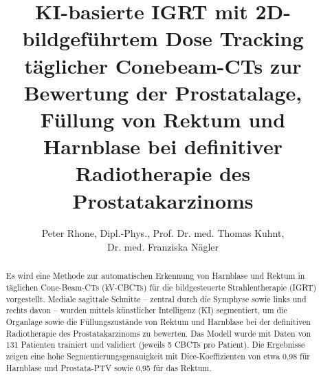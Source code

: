 \documentclass{article}
\begin{document}
\title{KI-basierte IGRT mit 2D-bildgeführtem Dose Tracking täglicher
Conebeam-CTs zur Bewertung der Prostatalage, Füllung von Rektum und Harnblase
bei definitiver Radiotherapie des Prostatakarzinoms}
\author{\begin{minipage}{0.8\textwidth}\centering \small Peter Rhone,
Dipl.-Phys., Prof. Dr. med. Thomas Kuhnt, \\ Dr. med. Franziska
Nägler\end{minipage}} \maketitle

\vspace{2cm}

\begin{abstract}
Es wird eine Methode zur automatischen Erkennung von Harnblase und Rektum in
täglichen Cone-Beam-CTs (kV-CBCTs) für die bildgesteuerte Strahlentherapie
(IGRT) vorgestellt. Mediale sagittale Schnitte – zentral durch die Symphyse
sowie links und rechts davon – wurden mittels künstlicher Intelligenz (KI)
segmentiert, um die Organlage sowie die Füllungszustände von Rektum und
Harnblase bei der definitiven Radiotherapie des Prostatakarzinoms zu bewerten.
Das Modell wurde mit Daten von 131 Patienten trainiert und validiert (jeweils 5
CBCTs pro Patient). Die Ergebnisse zeigen eine hohe Segmentierungsgenauigkeit
mit Dice-Koeffizienten von etwa 0,98 für Harnblase und Prostata-PTV sowie 0,95
für das Rektum.
\end{abstract}
\end{document}
